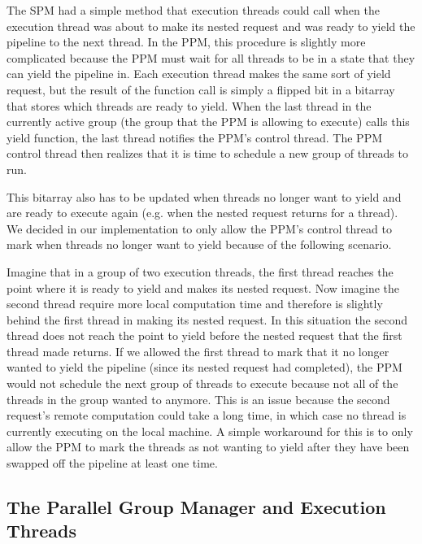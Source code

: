 \documentclass[11pt, oneside]{report}
\begin{document}
The SPM had a simple method that execution threads could call when the execution thread was about to make its nested request and was ready to yield the pipeline to the next thread. 
In the PPM, this procedure is slightly more complicated because the PPM must wait for all threads to be in a state that they can yield the pipeline in. 
Each execution thread makes the same sort of yield request, but the result of the function call is simply a flipped bit in a bitarray that stores which threads are ready to yield. 
When the last thread in the currently active group (the group that the PPM is allowing to execute) calls this yield function, the last thread notifies the PPM's control thread.
The PPM control thread then realizes that it is time to schedule a new group of threads to run. 

This bitarray also has to be updated when threads no longer want to yield and are ready to execute again (e.g. when the nested request returns for a thread). 
We decided in our implementation to only allow the PPM's control thread to mark when threads no longer want to yield because of the following scenario. 

Imagine that in a group of two execution threads, the first thread reaches the point where it is ready to yield and makes its nested request. 
Now imagine the second thread require more local computation time and therefore is slightly behind the first thread in making its nested request.
In this situation the second thread does not reach the point to yield before the nested request that the first thread made returns.
If we allowed the first thread to mark that it no longer wanted to yield the pipeline (since its nested request had completed), the PPM would not schedule the next group of threads to execute because not all of the threads in the group wanted to anymore.
This is an issue because the second request's remote computation could take a long time, in which case no thread is currently executing on the local machine.
A simple workaround for this is to only allow the PPM to mark the threads as not wanting to yield after they have been swapped off the pipeline at least one time.

\subsection{The Parallel Group Manager and Execution Threads}
\end{document}
